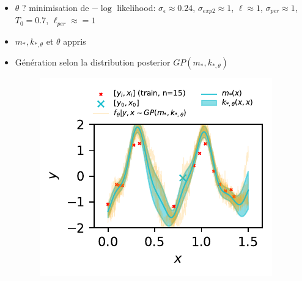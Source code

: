 \documentclass[xcolor=svgnames, t]{beamer}
\begin{document}
\begin{frame}{\subsecname}
  \begin{itemize}
    \item<1-> $\theta$ ? minimisation de $-\log$ likelihood:
    $\sigma_{\epsilon} \approx 0.24$, $\sigma_{exp2} \approx 1$, $\ell \approx 1$, $\sigma_{per} \approx 1$, $T_0 = 0.7$, $\ell_{per} \approx = 1$
    \item<2-> $m_{*}, k_{*, \theta}$ et $\theta$ appris
    \item<3-> Génération selon la distribution posterior $GP( m_{*}, k_{*, \theta} )$
      \begin{figure}
        \includegraphics{gp_1D_example_noisy_pred_meanvar.pdf}
      \end{figure}
  \end{itemize}
\end{frame}
\end{document}
